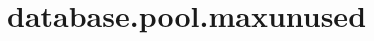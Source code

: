 \section{database.pool.maxunused}
\label{configuration:DatabasePoolMaxunused}
\AvailableInJavaOnly{\TODO}